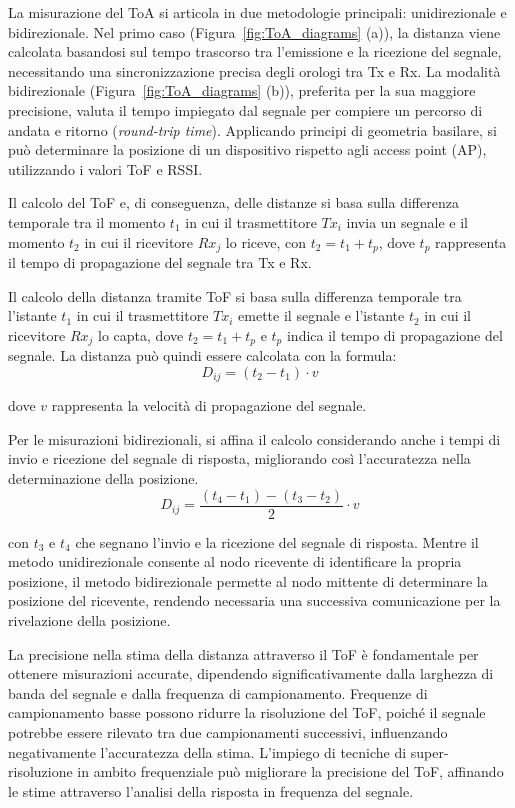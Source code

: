 La misurazione del ToA si articola in due metodologie principali: unidirezionale e bidirezionale. Nel primo caso (Figura~\ref{fig:ToA_diagrams} (a)), la distanza viene calcolata basandosi sul tempo trascorso tra l'emissione e la ricezione del segnale, necessitando una sincronizzazione precisa degli orologi tra Tx e Rx. La modalità bidirezionale (Figura~\ref{fig:ToA_diagrams} (b)), preferita per la sua maggiore precisione, valuta il tempo impiegato dal segnale per compiere un percorso di andata e ritorno (\textit{round-trip time}). Applicando principi di geometria basilare, si può determinare la posizione di un dispositivo rispetto agli access point (AP), utilizzando i valori ToF e RSSI.

Il calcolo del ToF e, di conseguenza, delle distanze si basa sulla differenza temporale tra il momento \( t_1 \) in cui il trasmettitore \( Tx_i \) invia un segnale e il momento \( t_2 \) in cui il ricevitore \( Rx_j \) lo riceve, con \( t_2 = t_1 + t_p \), dove \( t_p \) rappresenta il tempo di propagazione del segnale tra Tx e Rx. 

Il calcolo della distanza tramite ToF si basa sulla differenza temporale tra l'istante \( t_1 \) in cui il trasmettitore \( Tx_i \) emette il segnale e l'istante \( t_2 \) in cui il ricevitore \( Rx_j \) lo capta, dove \( t_2 = t_1 + t_p \) e \( t_p \) indica il tempo di propagazione del segnale. La distanza può quindi essere calcolata con la formula:  
\begin{equation}
    D_{ij} = (t_2 - t_1) \cdot v
\end{equation}

\noindent dove \(v\) rappresenta la velocità di propagazione del segnale. 

Per le misurazioni bidirezionali, si affina il calcolo considerando anche i tempi di invio e ricezione del segnale di risposta, migliorando così l'accuratezza nella determinazione della posizione.
\begin{equation}
    D_{ij} = \frac{(t_4 - t_1) - (t_3 - t_2)}{2} \cdot v
\end{equation}

\noindent con $t_3$ e $t_4$ che segnano l'invio e la ricezione del segnale di risposta. Mentre il metodo unidirezionale consente al nodo ricevente di identificare la propria posizione, il metodo bidirezionale permette al nodo mittente di determinare la posizione del ricevente, rendendo necessaria una successiva comunicazione per la rivelazione della posizione.

La precisione nella stima della distanza attraverso il ToF è fondamentale per ottenere misurazioni accurate, dipendendo significativamente dalla larghezza di banda del segnale e dalla frequenza di campionamento. Frequenze di campionamento basse possono ridurre la risoluzione del ToF, poiché il segnale potrebbe essere rilevato tra due campionamenti successivi, influenzando negativamente l'accuratezza della stima. L'impiego di tecniche di super-risoluzione in ambito frequenziale può migliorare la precisione del ToF, affinando le stime attraverso l'analisi della risposta in frequenza del segnale.

